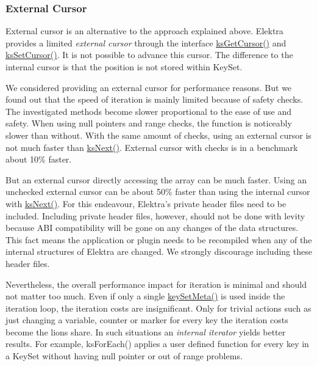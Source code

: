 \subsubsection*{External Cursor}

External cursor is an alternative to the approach explained above. Elektra provides a limited {\itshape external cursor} through the interface {\ttfamily \hyperlink{group__keyset_gaffe507ab9281c322eb16c3e992075d29}{ks\+Get\+Cursor()}} and {\ttfamily \hyperlink{group__keyset_gad94c9ffaa3e8034564c0712fd407c345}{ks\+Set\+Cursor()}}. It is not possible to advance this cursor. The difference to the internal cursor is that the position is not stored within {\ttfamily Key\+Set}.

We considered providing an external cursor for performance reasons. But we found out that the speed of iteration is mainly limited because of safety checks. The investigated methods become slower proportional to the ease of use and safety. When using null pointers and range checks, the function is noticeably slower than without. With the same amount of checks, using an external cursor is not much faster than {\ttfamily \hyperlink{group__keyset_ga317321c9065b5a4b3e33fe1c399bcec9}{ks\+Next()}}. External cursor with checks is in a benchmark about 10\% faster.

But an external cursor directly accessing the array can be much faster. Using an unchecked external cursor can be about 50\% faster than using the internal cursor with \hyperlink{group__keyset_ga317321c9065b5a4b3e33fe1c399bcec9}{ks\+Next()}. For this endeavour, Elektra’s private header files need to be included. Including private header files, however, should not be done with levity because A\+BI compatibility will be gone on any changes of the data structures. This fact means the application or plugin needs to be recompiled when any of the internal structures of Elektra are changed. We strongly discourage including these header files.

Nevertheless, the overall performance impact for iteration is minimal and should not matter too much. Even if only a single {\ttfamily \hyperlink{group__keymeta_gae1f15546b234ffb6007d8a31178652b9}{key\+Set\+Meta()}} is used inside the iteration loop, the iteration costs are insignificant. Only for trivial actions such as just changing a variable, counter or marker for every key the iteration costs become the lion\textquotesingle{}s share. In such situations an {\itshape internal iterator} yields better results. For example, {\ttfamily ks\+For\+Each()} applies a user defined function for every key in a {\ttfamily Key\+Set} without having null pointer or out of range problems.

